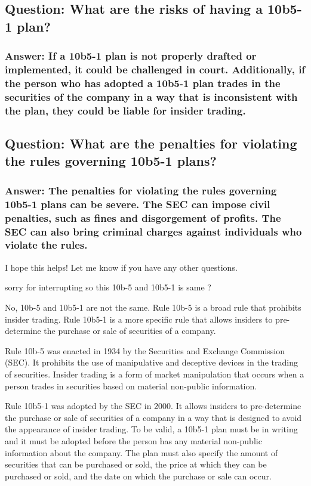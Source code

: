 \documentclass[11pt]{article}
\begin{document}
\subsection{Question: What are the risks of having a 10b5-1 plan?}
\label{sec:org667ba8f}

\subsubsection{Answer: If a 10b5-1 plan is not properly drafted or implemented, it could be challenged in court. Additionally, if the person who has adopted a 10b5-1 plan trades in the securities of the company in a way that is inconsistent with the plan, they could be liable for insider trading.}
\label{sec:org4086606}

\subsection{Question: What are the penalties for violating the rules governing 10b5-1 plans?}
\label{sec:org5ce0cc5}

\subsubsection{Answer: The penalties for violating the rules governing 10b5-1 plans can be severe. The SEC can impose civil penalties, such as fines and disgorgement of profits. The SEC can also bring criminal charges against individuals who violate the rules.}
\label{sec:orgac7bcb2}

I hope this helps! Let me know if you have any other questions.

sorry for interrupting
so this 10b-5 and 10b5-1 is same ?

No, 10b-5 and 10b5-1 are not the same. Rule 10b-5 is a broad rule that prohibits insider trading. Rule 10b5-1 is a more specific rule that allows insiders to pre-determine the purchase or sale of securities of a company.

Rule 10b-5 was enacted in 1934 by the Securities and Exchange Commission (SEC). It prohibits the use of manipulative and deceptive devices in the trading of securities. Insider trading is a form of market manipulation that occurs when a person trades in securities based on material non-public information.

Rule 10b5-1 was adopted by the SEC in 2000. It allows insiders to pre-determine the purchase or sale of securities of a company in a way that is designed to avoid the appearance of insider trading. To be valid, a 10b5-1 plan must be in writing and it must be adopted before the person has any material non-public information about the company. The plan must also specify the amount of securities that can be purchased or sold, the price at which they can be purchased or sold, and the date on which the purchase or sale can occur.
\end{document}
